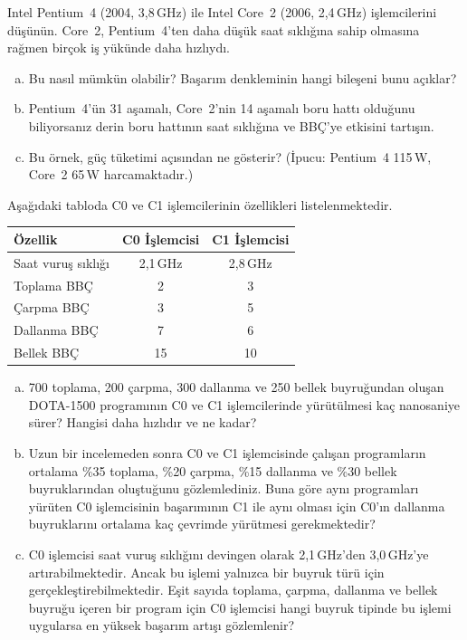 \begin{alistirma}[\zor]
Intel Pentium~4 (2004, 3,8\,GHz) ile Intel Core~2 (2006, 2,4\,GHz) işlemcilerini düşünün. Core~2, Pentium~4'ten daha düşük saat sıklığına sahip olmasına rağmen birçok iş yükünde daha hızlıydı.
\begin{enumerate}[(a)]
    \item Bu nasıl mümkün olabilir? Başarım denkleminin hangi bileşeni bunu açıklar?
    \item Pentium~4'ün 31 aşamalı, Core~2'nin 14 aşamalı boru hattı olduğunu biliyorsanız derin boru hattının saat sıklığına ve BBÇ'ye etkisini tartışın.
    \item Bu örnek, güç tüketimi açısından ne gösterir? (İpucu: Pentium~4 115\,W, Core~2 65\,W harcamaktadır.)
\end{enumerate}
\end{alistirma}

\begin{alistirma}[\zor]
Aşağıdaki tabloda C0 ve C1 işlemcilerinin özellikleri listelenmektedir.

\begin{center}
\begin{tabular}{lcc}
\toprule
\textbf{Özellik} & \textbf{C0 İşlemcisi} & \textbf{C1 İşlemcisi} \\
\midrule
Saat vuruş sıklığı & 2,1\,GHz & 2,8\,GHz \\
Toplama BBÇ & 2 & 3 \\
Çarpma BBÇ & 3 & 5 \\
Dallanma BBÇ & 7 & 6 \\
Bellek BBÇ & 15 & 10 \\
\bottomrule
\end{tabular}
\end{center}

\begin{enumerate}[(a)]
    \item 700 toplama, 200 çarpma, 300 dallanma ve 250 bellek buyruğundan oluşan DOTA-1500 programının C0 ve C1 işlemcilerinde yürütülmesi kaç nanosaniye sürer? Hangisi daha hızlıdır ve ne kadar?
    \item Uzun bir incelemeden sonra C0 ve C1 işlemcisinde çalışan programların ortalama \%35 toplama, \%20 çarpma, \%15 dallanma ve \%30 bellek buyruklarından oluştuğunu gözlemlediniz. Buna göre aynı programları yürüten C0 işlemcisinin başarımının C1 ile aynı olması için C0'ın dallanma buyruklarını ortalama kaç çevrimde yürütmesi gerekmektedir?
    \item C0 işlemcisi saat vuruş sıklığını devingen olarak 2,1\,GHz'den 3,0\,GHz'ye artırabilmektedir. Ancak bu işlemi yalnızca bir buyruk türü için gerçekleştirebilmektedir. Eşit sayıda toplama, çarpma, dallanma ve bellek buyruğu içeren bir program için C0 işlemcisi hangi buyruk tipinde bu işlemi uygularsa en yüksek başarım artışı gözlemlenir?
\end{enumerate}
\end{alistirma}

